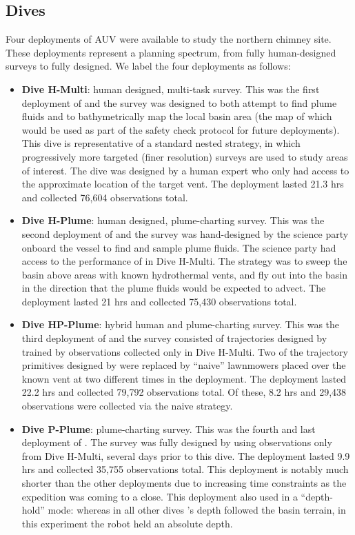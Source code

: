 \subsection{Dives}
\label{sec:field_dives}
Four deployments of AUV \Sentry were available to study the northern chimney site. These deployments represent a planning spectrum, from fully human-designed surveys to fully \PHORTEX designed. We label the four deployments as follows:
\begin{itemize}
    \item \textbf{Dive H-Multi}: human designed, multi-task survey. This was the first deployment of \Sentry and the survey was designed to both attempt to find plume fluids and to bathymetrically map the local basin area (the map of which would be used as part of the safety check protocol for future deployments). This dive is representative of a standard nested strategy, in which progressively more targeted (finer resolution) surveys are used to study areas of interest. The dive was designed by a human expert who only had access to the approximate location of the target vent. The deployment lasted 21.3 hrs and collected 76,604 observations total.
    \item \textbf{Dive H-Plume}: human designed, plume-charting survey. This was the second deployment of \Sentry and the survey was hand-designed by the science party onboard the vessel to find and sample plume fluids. The science party had access to the performance of \Sentry in Dive H-Multi. The strategy was to sweep the basin above areas with known hydrothermal vents, and fly out into the basin in the direction that the plume fluids would be expected to advect. The deployment lasted 21 hrs and collected 75,430 observations total.
    \item \textbf{Dive HP-Plume}: hybrid human and \PHORTEX plume-charting survey. This was the third deployment of \Sentry and the survey consisted of trajectories designed by \PHORTEX trained by observations collected only in Dive H-Multi. Two of the trajectory primitives designed by \PHORTEX were replaced by ``naive'' lawnmowers placed over the known vent at two different times in the deployment. The deployment lasted 22.2 hrs and collected 79,792 observations total. Of these, 8.2 hrs and 29,438 observations were collected via the naive strategy.
    \item \textbf{Dive P-Plume}: \PHORTEX plume-charting survey. This was the fourth and last deployment of \Sentry. The survey was fully designed by \PHORTEX using observations only from Dive H-Multi, several days prior to this dive. The deployment lasted 9.9 hrs and collected 35,755 observations total. This deployment is notably much shorter than the other deployments due to increasing time constraints as the expedition was coming to a close. This deployment also used \Sentry in a ``depth-hold'' mode: whereas in all other dives \Sentry's depth followed the basin terrain, in this experiment the robot held an absolute depth.
\end{itemize}

